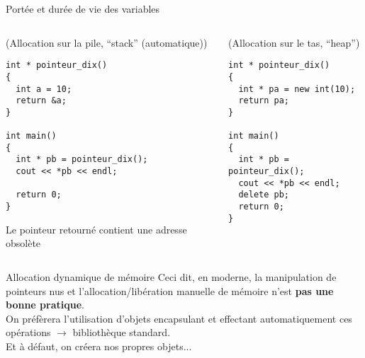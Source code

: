 \documentclass[c]{beamer}
\begin{document}
\begin{frame}[fragile]{Portée et durée de vie des variables}
 \begin{columns}
\begin{column}{0.7\columnwidth}
\begin{cbox}[][lwuc][\footnotesize](Allocation sur la pile, “stack” (automatique))
\begin{verbatim}
int * pointeur_dix()
{
  int a = 10;
  return &a;
}

int main()
{
  int * pb = pointeur_dix();
  cout << *pb << endl;

  return 0;
}
\end{verbatim}

\begin{cbox}[5][lrtuc][\centering][3.5][7]
Le pointeur retourné contient une adresse obsolète
\end{cbox}

\pause
\end{cbox}
\end{column}

\begin{column}{0.6\columnwidth}
\begin{cbox}[][lwuc][\footnotesize](Allocation sur le tas, “heap”)
\begin{verbatim}
int * pointeur_dix()
{
  int * pa = new int(10);
  return pa;
}

int main()
{
  int * pb = pointeur_dix();
  cout << *pb << endl;
  delete pb;
  return 0;
}
\end{verbatim}
\end{cbox}
\end{column}
\end{columns}
\end{frame}


\begin{frame}[fragile]{Allocation dynamique de mémoire}
Ceci dit, en \Cpp moderne, la manipulation de pointeurs nus et l'allocation/libération manuelle de mémoire n'est \textbf{pas une bonne pratique}.\\

On préfèrera l'utilisation d'objets encapsulant et effectant automatiquement ces opérations $\rightarrow$ bibliothèque standard.\\
Et à défaut, on créera nos propres objets...
\end{frame}
\end{document}
